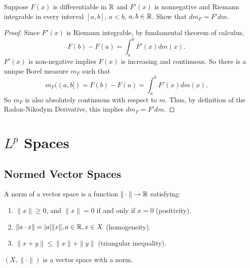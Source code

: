 \documentclass[class=book, crop=false]{standalone}
\begin{document}
        \begin{question}
            Suppose $F(x)$ is differentiable in $\mathbb{R}$ and $F'(x)$ is nonnegative and Riemann integrable in every interval $[a, b]$, $a < b$, $a, b \in \mathbb{R}$. Show that $dm_F = F' dm$.
        \end{question}
        \begin{proof}
            Since $F'(x)$ is Riemann integrable, by fundamental theorem of calculus,
            \begin{equation*}
                F(b) - F(a) = \int^b_a F'(x) dm(x).
            \end{equation*}
            $F'(x)$ is non-negative implies $F(x)$ is increasing and continuous. So there is a unique Borel measure $m_F$ such that
            \begin{equation*}
                m_F((a, b]) = F(b) - F(a) = \int^b_a F'(x) dm(x).
            \end{equation*}
            So $m_F$ is also absolutely continuous with respect to $m$. Thus, by definition of the Radon-Nikodym Derivative, this implies $dm_F = F' dm$.
        \end{proof}


    \section{$L^p$ Spaces}
        \subsection{Normed Vector Spaces}
        \begin{definition}[Norm]
            A norm of a vector space is a function $\|\cdot\| \rightarrow \mathbb{R}$ satisfying:
            \begin{enumerate}
                \item $\|x\| \geq 0$, and $\|x\| = 0$ if and only if $x = 0$ (positivity).
                \item $\|a \cdot x\| = |a| \|x\|, a \in \mathbb{R}, x \in X$ (homogeneity).
                \item $\|x + y\| \leq \|x\| + \|y\|$ (triangular inequality).
            \end{enumerate}
        \end{definition}

        \begin{definition}
            $(X, \|\cdot\|)$ is a vector space with a norm.
        \end{definition}
        
\end{document}
